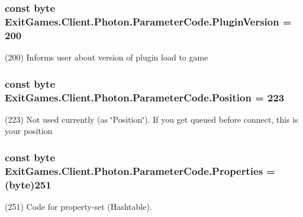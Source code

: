 \subsubsection[{\texorpdfstring{Plugin\+Version}{PluginVersion}}]{\setlength{\rightskip}{0pt plus 5cm}const byte Exit\+Games.\+Client.\+Photon.\+Parameter\+Code.\+Plugin\+Version = 200}\hypertarget{class_exit_games_1_1_client_1_1_photon_1_1_parameter_code_a7e1a62d2c1df9bb4b8c013e6a8e3c42f}{}\label{class_exit_games_1_1_client_1_1_photon_1_1_parameter_code_a7e1a62d2c1df9bb4b8c013e6a8e3c42f}


(200) Informs user about version of plugin load to game

\subsubsection[{\texorpdfstring{Position}{Position}}]{\setlength{\rightskip}{0pt plus 5cm}const byte Exit\+Games.\+Client.\+Photon.\+Parameter\+Code.\+Position = 223}\hypertarget{class_exit_games_1_1_client_1_1_photon_1_1_parameter_code_ad01a54fbf9cfe164bab3b2d3fae052f3}{}\label{class_exit_games_1_1_client_1_1_photon_1_1_parameter_code_ad01a54fbf9cfe164bab3b2d3fae052f3}


(223) Not used currently (as \char`\"{}\+Position\char`\"{}). If you get queued before connect, this is your position

\subsubsection[{\texorpdfstring{Properties}{Properties}}]{\setlength{\rightskip}{0pt plus 5cm}const byte Exit\+Games.\+Client.\+Photon.\+Parameter\+Code.\+Properties = (byte)251}\hypertarget{class_exit_games_1_1_client_1_1_photon_1_1_parameter_code_a9fbcbc9fff142b9064f18c9efc91f6ac}{}\label{class_exit_games_1_1_client_1_1_photon_1_1_parameter_code_a9fbcbc9fff142b9064f18c9efc91f6ac}


(251) Code for property-\/set (Hashtable). 

